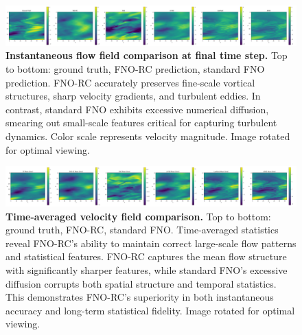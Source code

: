 \documentclass[11pt]{article}
\begin{document}
\begin{figure}[p]
\centering
\includegraphics[angle=90, width=0.95\textheight]{../实验图/final_slice.png}
\caption{\textbf{Instantaneous flow field comparison at final time step.} Top to bottom: ground truth, FNO-RC prediction, standard FNO prediction. FNO-RC accurately preserves fine-scale vortical structures, sharp velocity gradients, and turbulent eddies. In contrast, standard FNO exhibits excessive numerical diffusion, smearing out small-scale features critical for capturing turbulent dynamics. Color scale represents velocity magnitude. Image rotated for optimal viewing.}
\label{fig:flow_instant}
\end{figure}

\begin{figure}[p]
\centering
\includegraphics[angle=90, width=0.95\textheight]{../实验图/mean_time.png}
\caption{\textbf{Time-averaged velocity field comparison.} Top to bottom: ground truth, FNO-RC, standard FNO. Time-averaged statistics reveal FNO-RC's ability to maintain correct large-scale flow patterns and statistical features. FNO-RC captures the mean flow structure with significantly sharper features, while standard FNO's excessive diffusion corrupts both spatial structure and temporal statistics. This demonstrates FNO-RC's superiority in both instantaneous accuracy and long-term statistical fidelity. Image rotated for optimal viewing.}
\label{fig:flow_mean}
\end{figure}
\end{document}
